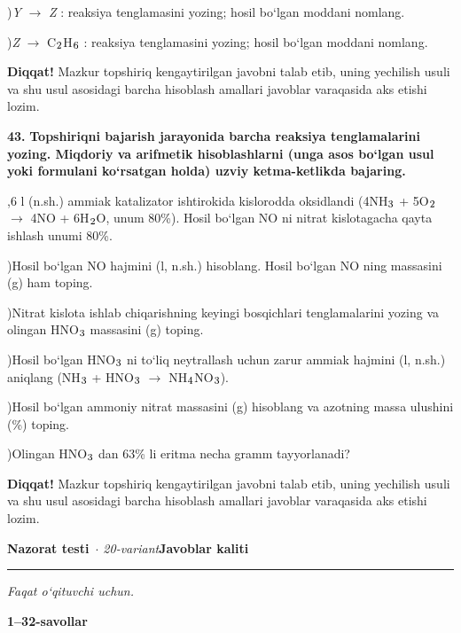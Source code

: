 \documentclass[11pt,a4paper]{article}
\renewcommand{\textsubscript}[1]{\ensuremath{_{\text{\fontsize{8}{8}\selectfont #1}}}}
\newcommand{\diqqat}[1]{\par\smallskip\noindent\textbf{Diqqat!} #1\par\medskip}
\begin{document}
)\textit{Y} $\to$ \textit{Z} : reaksiya tenglamasini yozing; hosil bo`lgan moddani nomlang.\par
{})\textit{Z} $\to$ C\textsubscript{2}H\textsubscript{6} : reaksiya tenglamasini yozing; hosil bo`lgan moddani nomlang.\par
\diqqat{Mazkur topshiriq kengaytirilgan javobni talab etib, uning yechilish usuli va shu usul asosidagi barcha hisoblash amallari javoblar varaqasida aks etishi lozim.}
\noindent\textbf{43.} \textbf{Topshiriqni bajarish jarayonida barcha reaksiya tenglamalarini yozing. Miqdoriy va arifmetik hisoblashlarni (unga asos bo`lgan usul yoki formulani ko`rsatgan holda) uzviy ketma-ketlikda bajaring.}\par{},6 l (n.sh.) ammiak katalizator ishtirokida kislorodda oksidlandi (4NH\textsubscript{3} + 5O\textsubscript{2} $\to$ 4NO + 6H\textsubscript{2}O, unum 80\%). Hosil bo`lgan NO ni nitrat kislotagacha qayta ishlash unumi 80\%.\par
{})Hosil bo`lgan NO hajmini (l, n.sh.) hisoblang. Hosil bo`lgan NO ning massasini (g) ham toping.\par
{})Nitrat kislota ishlab chiqarishning keyingi bosqichlari tenglamalarini yozing va olingan HNO\textsubscript{3} massasini (g) toping.\par
{})Hosil bo`lgan HNO\textsubscript{3} ni to`liq neytrallash uchun zarur ammiak hajmini (l, n.sh.) aniqlang (NH\textsubscript{3} + HNO\textsubscript{3} $\to$ NH\textsubscript{4}NO\textsubscript{3}).\par
{})Hosil bo`lgan ammoniy nitrat massasini (g) hisoblang va azotning massa ulushini (\%) toping.\par
{})Olingan HNO\textsubscript{3} dan 63\% li eritma necha gramm tayyorlanadi?\par
\diqqat{Mazkur topshiriq kengaytirilgan javobni talab etib, uning yechilish usuli va shu usul asosidagi barcha hisoblash amallari javoblar varaqasida aks etishi lozim.}
\newpage
\noindent\textbf{\fontsize{13}{15}\selectfont Nazorat testi}\ \textit{$\cdot$ 20-variant}\hfill \textbf{Javoblar kaliti}\par\smallskip\hrule\smallskip
\textit{Faqat o`qituvchi uchun.}\par\medskip
\noindent\textbf{1--32-savollar}\par\smallskip
\end{document}
